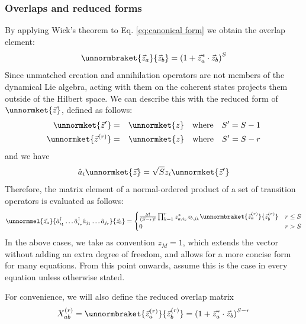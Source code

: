 \documentclass[12pt]{article}
\begin{document}
	\subsubsection{Overlaps and reduced forms}
	By applying Wick's theorem to Eq. \ref{eq:canonical form} we obtain the overlap element:
	\begin{equation}\label{eq:overlap}
	\unnormbraket{\vec{z}_a}{\vec{z}_b}=\left(1+\vec{z}_a^*\cdot\vec{z}_b\right)^S
	\end{equation}
	Since unmatched creation and annihilation operators are not members of the dynamical Lie algebra, acting with them on the coherent states projects them outside of the Hilbert space. We can describe this with the reduced form of $\unnormket{\vec{z}}$, defined as follows:
	\begin{eqnarray}
	\unnormket{\vec{z}'}&=&\unnormket{z}\qq{where}S'=S-1\\
	\unnormket{\vec{z}^{(r)}}&=&\unnormket{z}\qq{where}S'=S-r
	\end{eqnarray}
	and we have
	\begin{equation}
	\hat{a}_i\unnormket{\vec{z}}=\sqrt{S}z_i\unnormket{\vec{z}'}
	\end{equation}
	Therefore, the matrix element of a normal-ordered product of a set of transition operators is evaluated as follows:
	\begin{equation}\label{eq:reduced overlap}
	\unnormmel{\vec{z}_a}{\hat{a}^\dagger_{i_1}\dots \hat{a}^\dagger_{i_r}\hat{a}_{j_1}\dots \hat{a}_{j_r}}{\vec{z}_b}=\begin{cases}
	\frac{S!}{(S-r)!}\prod_{k=1}^r z^*_{a,i_k}z_{b,j_k}\unnormbraket{\vec{z}_a^{(r)}}{\vec{z}_b^{(r)}} & r \leq S\\
	0 & r > S
	\end{cases}
	\end{equation}
	In the above cases, we take as convention $z_M=1$, which extends the vector without adding an extra degree of freedom, and allows for a more concise form for many equations. From this point onwards, assume this is the case in every equation unless otherwise stated.
	
	For convenience, we will also define the reduced overlap matrix
	\begin{equation}
	X^{(r)}_{ab}=\unnormbraket{\vec{z}^{(r)}_a}{\vec{z}^{(r)}_b}=\left(1+\vec{z}_a^*\cdot\vec{z}_b\right)^{S-r}
	\end{equation}
	
\end{document}
